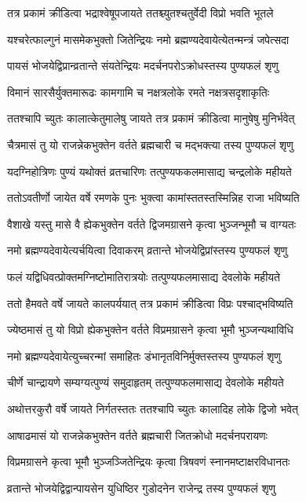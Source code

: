 \twolineshloka
{तत्र प्रकामं क्रीडित्वा भद्राश्वेषूपजायते}
{ततश्च्युतश्चतुर्वेदी विप्रो भवति भूतले}


\twolineshloka
{यश्चरेत्फाल्गुनं मासमेकभुक्तो जितेन्द्रियः}
{नमो ब्रह्मण्यदेवायेत्येतन्मन्त्रं जपेत्सदा}


\twolineshloka
{पायसं भोजयेद्विप्रान्व्रतान्ते संयतेन्द्रियः}
{मदर्चनपरोऽक्रोधस्तस्य पुण्यफलं शृणु}


\twolineshloka
{विमानं सारसैर्युक्तमारूढः कामगामि च}
{नक्षत्रलोके रमते नक्षत्रसदृशाकृतिः}


\twolineshloka
{ततश्चापि च्युतः कालात्केतुमालेषु जायते}
{तत्र प्रकामं क्रीडित्वा मानुषेषु मुनिर्भवेत्}


\twolineshloka
{चैत्रमासं तु यो राजन्नेकभुक्तेन वर्तते}
{ब्रह्मचारी च मद्भक्त्या तस्य पुण्यफलं शृणु}


\twolineshloka
{यदग्निहोत्रिणः पुण्यं यथोक्तं व्रतचारिणः}
{तत्पुण्यफकलमासाद्य चन्द्रलोके महीयते}


\twolineshloka
{ततोऽवतीर्णो जायेत वर्षे रमणके पुनः}
{भुक्त्वा कामांस्ततस्तस्मिन्निह राजा भविष्यति}


\twolineshloka
{वैशाखे यस्तु मासे वै ह्येकभुक्तेन वर्तते}
{द्विजमग्रासने कृत्वा भुञ्जन्भूमौ च वाग्यतः}


\twolineshloka
{नमो ब्रह्मण्यदेवायेत्यर्चयित्वा दिवाकरम्}
{व्रतान्ते भोजयेद्विप्रांस्तस्य पुण्यफलं शृणु}


\twolineshloka
{फलं यद्विधिवत्प्रोक्तमग्निष्टोमातिरात्रयोः}
{तत्पुण्यफलमासाद्य देवलोके महीयते}


\twolineshloka
{ततो हैमवते वर्षे जायते कालपर्ययात्}
{तत्र प्रकामं क्रीडित्वा विप्रः पश्चाद्भविष्यति}


\twolineshloka
{ज्येष्ठमासं तु यो विप्रो ह्येकभुक्तेन वर्तते}
{विप्रमग्रासने कृत्वा भूमौ भुञ्जन्यथाविधि}


\twolineshloka
{नमो ब्रह्मण्यदेवायेत्युच्चरन्मां समाहितः}
{डंभानृतविनिर्मुक्तस्तस्य पुण्यफलं शृणु}


\twolineshloka
{चीर्णे चान्द्रायणे सम्यग्यत्पुण्यं समुदाहृतम्}
{तत्पुण्यफलमासाद्य देवलोके महीयते}


\twolineshloka
{अथोत्तरकुरौ वर्षे जायते निर्गतस्ततः}
{ततश्चापि च्युतः कालादिह लोके द्विजो भवेत्}


\twolineshloka
{आषाढमासं यो राजन्नेकभुक्तेन वर्तते}
{ब्रह्मचारी जितक्रोधो मदर्चनपरायणः}


\twolineshloka
{विप्रमग्रासने कृत्वा भूमौ भुञ्जञ्जितेन्द्रियः}
{कृत्वा त्रिषवणं स्नानमष्टाक्षरविधानतः}


\twolineshloka
{व्रतान्ते भोजयेद्विद्वान्पायसेन युधिष्ठिर}
{गुडोदनेन राजेन्द्र तस्य पुण्यफलं शृणु}


